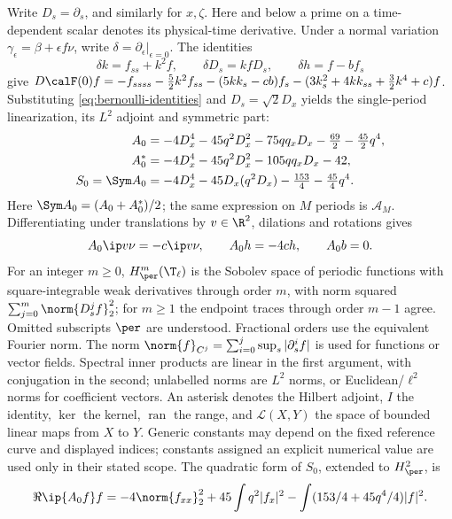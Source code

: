 Write $D_s=\partial_s$, and similarly for $x,\zeta$. Here and below a prime on a time-dependent scalar denotes its physical-time derivative. Under a normal variation $\gamma_\epsilon=\beta+\epsilon f\nu$, write $\delta=\partial_\epsilon|_{\epsilon=0}$. The identities
\[
 \delta k=f_{ss}+k^2f,\qquad \delta D_s=kfD_s,\qquad \delta h=f-bf_s
\]
give $D\calF(0)f=-f_{ssss}-\tfrac52k^2f_{ss}-(5kk_s-cb)f_s-(3k_s^2+4kk_{ss}+\tfrac32k^4+c)f$. Substituting \eqref{eq:bernoulli-identities} and $D_s=\sqrt2D_x$ yields the single-period linearization, its $L^2$ adjoint and symmetric part:
\begin{align}
 A_0&=-4D_x^4-45q^2D_x^2-75qq_xD_x-\tfrac{69}{2}-\tfrac{45}{2}q^4,
 \label{eq:A0}\\
 A_0^*&=-4D_x^4-45q^2D_x^2-105qq_xD_x-42,\label{eq:Astar}\\
 S_0=\Sym A_0&=-4D_x^4-45D_x(q^2D_x)-\tfrac{153}{4}-\tfrac{45}{4}q^4.
 \label{eq:S0}
\end{align}
Here $\Sym A_0=(A_0+A_0^*)/2$; the same expression on $M$ periods is $\mathcal A_M$. Differentiating under translations by $v\in\R^2$, dilations and rotations gives
\begin{equation}\label{eq:modes}
 A_0\ip v\nu=-c\ip v\nu,\qquad A_0h=-4ch,\qquad A_0b=0.
\end{equation}
For an integer $m\ge0$, $H^m_\per(\T_\ell)$ is the Sobolev space of periodic functions with square-integrable weak derivatives through order $m$, with norm squared $\sum_{j=0}^m\norm{D_s^jf}_2^2$; for $m\ge1$ the endpoint traces through order $m-1$ agree. Omitted subscripts $\per$ are understood. Fractional orders use the equivalent Fourier norm. The norm $\norm{f}_{C^j}=\sum_{i=0}^j\sup_s|\partial_s^if|$ is used for functions or vector fields. Spectral inner products are linear in the first argument, with conjugation in the second; unlabelled norms are $L^2$ norms, or Euclidean/$\ell^2$ norms for coefficient vectors. An asterisk denotes the Hilbert adjoint, $I$ the identity, $\ker$ the kernel, $\operatorname{ran}$ the range, and $\mathcal L(X,Y)$ the space of bounded linear maps from $X$ to $Y$. Generic constants may depend on the fixed reference curve and displayed indices; constants assigned an explicit numerical value are used only in their stated scope.
The quadratic form of $S_0$, extended to $H^2_\per$, is
\begin{equation}\label{eq:energy}
 \Re\ip{A_0f}f=-4\norm{f_{xx}}_2^2+45\int q^2|f_x|^2
       -\int(153/4+45q^4/4)|f|^2.
\end{equation}

